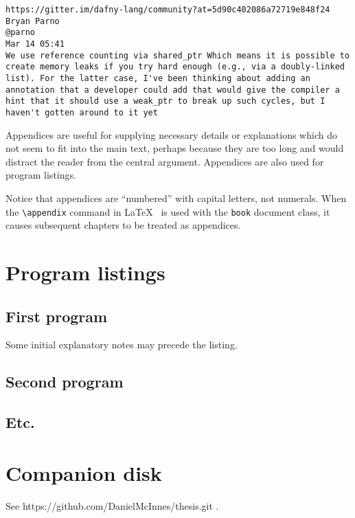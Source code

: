 \documentclass[12pt,openany,a4paper]{book}
\begin{document}
\label{dafnybug2}
\begin{verbatim}
https://gitter.im/dafny-lang/community?at=5d90c402086a72719e848f24
Bryan Parno
@parno
Mar 14 05:41
We use reference counting via shared_ptr Which means it is possible to create memory leaks if you try hard enough (e.g., via a doubly-linked list). For the latter case, I've been thinking about adding an annotation that a developer could add that would give the compiler a hint that it should use a weak_ptr to break up such cycles, but I haven't gotten around to it yet
\end{verbatim}





Appendices are useful for supplying necessary details or explanations
which do not seem to fit into the main text, perhaps because they are
too long and would distract the reader from the central argument.
Appendices are also used for program listings.

Notice that appendices are ``numbered'' with capital letters, not
numerals.  When the \verb+\appendix+ command in
\LaTeX~\cite[p.\,175]{lamport} is used with the \texttt{book} document
class, it causes subsequent chapters to be treated as appendices.

\chapter{Program listings}

\section{First program}

Some initial explanatory notes may precede the listing.

\section{Second program}

\section{Etc.}

\chapter{Companion disk}

See https://github.com/DanielMcInnes/thesis.git .

\cleardoublepage

\nocite{*}


\end{document}
